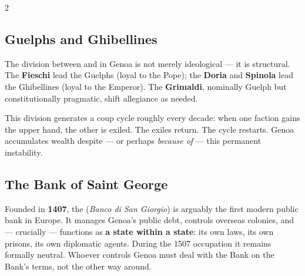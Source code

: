 \begin{multicols}{2}

\subsection{Guelphs and Ghibellines}


The division between  and  in Genoa
is not merely ideological --- it is structural. The \textbf{Fieschi} lead
the Guelphs (loyal to the Pope); the \textbf{Doria} and \textbf{Spinola}
lead the Ghibellines (loyal to the Emperor). The \textbf{Grimaldi},
nominally Guelph but constitutionally pragmatic, shift allegiance as needed.

This division generates a coup cycle roughly every decade: when one faction
gains the upper hand, the other is exiled. The exiles return. The cycle
restarts. Genoa accumulates wealth despite --- or perhaps \textit{because of}
--- this permanent instability.

\columnbreak

\subsection{The Bank of Saint George}


Founded in \textbf{1407}, the  (\textit{Banco
di San Giorgio}) is arguably the first modern public bank in Europe. It
manages Genoa's public debt, controls overseas colonies, and --- crucially
--- functions as \textbf{a state within a state}: its own laws, its own
prisons, its own diplomatic agents. During the 1507 occupation it remains
formally neutral. Whoever controls Genoa must deal with the Bank on the
Bank's terms, not the other way around.

\end{multicols}

